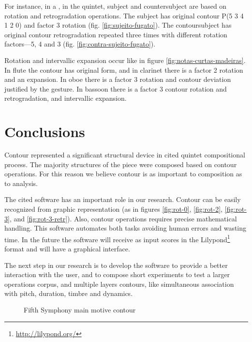 For instance, in a , in the quintet, subject and
countersubject are based on rotation and retrogradation
operations. The subject has original contour P(5 3 4 1 2 0) and factor
3 rotation (fig. \ref{fig:sujeito-fugato}). The contoursubject has
original contour retrogradation repeated three times with different
rotation factors---5, 4 and 3 (fig. \ref{fig:contra-sujeito-fugato}).

Rotation and intervallic expansion occur like in figure
\ref{fig:notas-curtas-madeiras}. In flute the contour has original
form, and in clarinet there is a factor 2 rotation and an
expansion. In oboe there is a factor 3 rotation and contour deviation
justified by the gesture. In bassoon there is a factor 3 contour
rotation and retrogradation, and intervallic expansion.

\section{Conclusions}
\label{sec:conclusions}

Contour represented a significant structural device in cited quintet
compositional process. The majority structures of the piece were
composed based on contour operations. For this reason we believe
contour is as important to composition as to analysis.

The cited software has an important role in our research. Contour can
be easily recognized from graphic representation (as in figures
\ref{fig:rot-0}, \ref{fig:rot-2}, \ref{fig:rot-3}, and
\ref{fig:rot-3-retr}). Also, contour operations requires precise
mathematical handling. This software automates both tasks avoiding
human errors and wasting time. In the future the software will receive
as input scores in the Lilypond\footnote{\url{http://lilypond.org/}}
format and will have a graphical interface.

The next step in our research is to develop the software to provide a
better interaction with the user, and to compose short experiments to
test a larger operations corpus, and multiple layers contours, like
simultaneous association with pitch, duration, timbre and dynamics.

\break

\begin{figure}[!p]
  \centering
  \subfloat[Contour (3 1 2 0)]{
    \texttt{[image: c-3120]}
    \label{fig:c-3120}
  }
  \caption{Fifth Symphony main motive contour}
  \label{fig:5a-sinfonia}
\end{figure}

